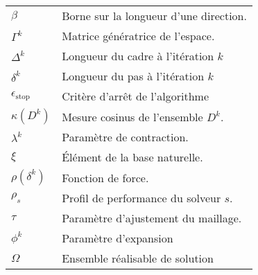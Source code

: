 \begin{longtable}{lp{5in}}
$\beta$ & Borne sur la longueur d'une direction.\\
$\Gamma^k$ & Matrice génératrice de l'espace.\\
$\Delta^k$ & Longueur du cadre à l'itération $k$\\
$\delta^k$ & Longueur du pas à l'itération $k$\\
$\epsilon_{\text{stop}}$ & Critère d'arrêt de l'algorithme\\
$\kappa(D^k)$ & Mesure cosinus de l'ensemble $D^k$.\\
$\lambda^k$ & Paramètre de contraction.\\
$\xi$ & Élément de la base naturelle.\\
$\rho(\delta^k)$ & Fonction de force.\\
$\rho_s$ & Profil de performance du solveur $s$.\\ 
$\tau$ & Paramètre d'ajustement du maillage.\\
$\phi^k$ & Paramètre d'expansion \\
$\Omega$ & Ensemble réalisable de solution\\
\end{longtable}

